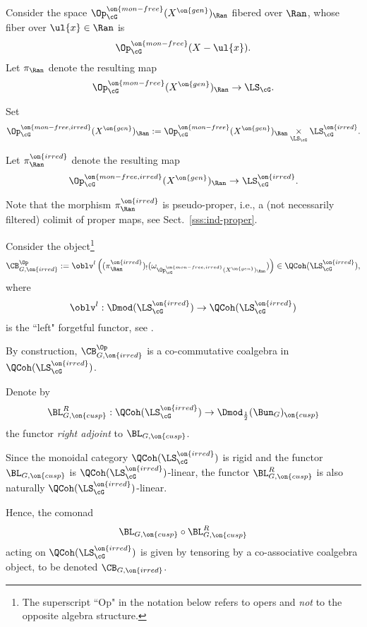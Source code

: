 \documentclass[9pt]{amsart}
\theoremstyle{remark}
\theoremstyle{definition}
\theoremstyle{remark}
\newcommand{\secref}[1]{Sect.~\ref{#1}}
\numberwithin{equation}{section}
\begin{document}

\sssec{}

Consider the space $\Op^{\on{mon-free}}_\cG(X^{\on{gen}})_\Ran$ fibered over $\Ran$, whose fiber over
$\ul{x}\in \Ran$ is $$\Op^{\on{mon-free}}_\cG(X-\ul{x}).$$ Let $\pi_\Ran$ denote the resulting map 
$$\Op^{\on{mon-free}}_\cG(X^{\on{gen}})_\Ran\to \LS_\cG.$$

\medskip

Set
$$\Op^{\on{mon-free,irred}}_\cG(X^{\on{gen}})_\Ran:=\Op^{\on{mon-free}}_\cG(X^{\on{gen}})_\Ran\underset{\LS_\cG}\times \LS^{\on{irred}}_\cG.$$

Let $\pi^{\on{irred}}_\Ran$ denote the resulting map
$$\Op^{\on{mon-free,irred}}_\cG(X^{\on{gen}})_\Ran\to \LS^{\on{irred}}_\cG.$$

Note that the morphism $\pi^{\on{irred}}_\Ran$ is pseudo-proper, i.e., a (not necessarily filtered) colimit of proper maps,
see \secref{sss:ind-proper}. 

\sssec{}

Consider the object\footnote{The superscript ``Op" in the notation below refers to opers and \emph{not} to the opposite algebra structure.}
$$\CB^{\Op}_{G,\on{irred}}:=\oblv^l\left((\pi^{\on{irred}}_\Ran)_!(\omega_{\Op^{\on{mon-free,irred}}_\cG(X^{\on{gen}})_\Ran})\right)\in \QCoh(\LS^{\on{irred}}_\cG),$$
where 
$$\oblv^l:\Dmod(\LS^{\on{irred}}_\cG)\to \QCoh(\LS^{\on{irred}}_\cG)$$
is the ``left" forgetful functor, see \cite[Equation (5.3)]{GaRo1}.

\medskip

By construction, $\CB^{\Op}_{G,\on{irred}}$ is a co-commutative coalgebra in $\QCoh(\LS^{\on{irred}}_\cG)$. 

\sssec{}

Denote by
$$\BL^R_{G,\on{cusp}}:\QCoh(\LS^{\on{irred}}_\cG)\to \Dmod_{\frac{1}{2}}(\Bun_G)_{\on{cusp}}$$
the functor \emph{right adjoint} to $\BL_{G,\on{cusp}}$. 

\medskip

Since the monoidal category $\QCoh(\LS^{\on{irred}}_\cG)$ is rigid and the functor $\BL_{G,\on{cusp}}$ is
$\QCoh(\LS^{\on{irred}}_\cG)$-linear, the functor $\BL^R_{G,\on{cusp}}$ is also naturally 
$\QCoh(\LS^{\on{irred}}_\cG)$-linear.

\medskip

Hence, the comonad
$$\BL_{G,\on{cusp}}\circ \BL^R_{G,\on{cusp}}$$
acting on $\QCoh(\LS^{\on{irred}}_\cG)$ is given by tensoring by a co-associative coalgebra object,
to be denoted $\CB_{G,\on{irred}}$. 
\end{document}
